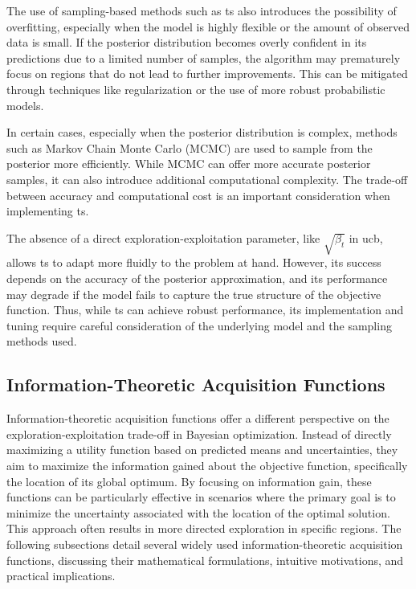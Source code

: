 The use of sampling-based methods such as \ac{ts} also introduces the possibility of overfitting, especially when the model is highly flexible or the amount of observed data is small. If the posterior distribution becomes overly confident in its predictions due to a limited number of samples, the algorithm may prematurely focus on regions that do not lead to further improvements. This can be mitigated through techniques like regularization or the use of more robust probabilistic models.

In certain cases, especially when the posterior distribution is complex, methods such as Markov Chain Monte Carlo (MCMC) are used to sample from the posterior more efficiently. While MCMC can offer more accurate posterior samples, it can also introduce additional computational complexity. The trade-off between accuracy and computational cost is an important consideration when implementing \acf{ts}.

The absence of a direct exploration-exploitation parameter, like \(\sqrt{\beta_t}\) in \ac{ucb}, allows \acf{ts} to adapt more fluidly to the problem at hand. However, its success depends on the accuracy of the posterior approximation, and its performance may degrade if the model fails to capture the true structure of the objective function. Thus, while \acf{ts} can achieve robust performance, its implementation and tuning require careful consideration of the underlying model and the sampling methods used.

\subsection{Information-Theoretic Acquisition Functions}
\label{section:information_theoretic_acquisition_functions}

Information-theoretic acquisition functions offer a different perspective on the exploration-exploitation trade-off in Bayesian optimization. Instead of directly maximizing a utility function based on predicted means and uncertainties, they aim to maximize the information gained about the objective function, specifically the location of its global optimum. By focusing on information gain, these functions can be particularly effective in scenarios where the primary goal is to minimize the uncertainty associated with the location of the optimal solution. This approach often results in more directed exploration in specific regions. The following subsections detail several widely used information-theoretic acquisition functions, discussing their mathematical formulations, intuitive motivations, and practical implications.

